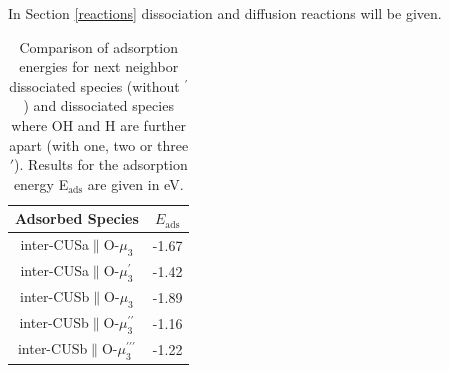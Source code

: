 \documentclass[11pt,DIV=13,BCOR=5mm,a4paper,headinclude]{scrbook}
\begin{document}
In Section \ref{reactions} dissociation and diffusion reactions will be given.
\begin{table}[!ht]
  \centering
 \caption{Comparison of adsorption energies for next neighbor dissociated species (without $^\prime$) and dissociated species where OH and H are further apart (with one, two or three $\prime$). 
Results for the adsorption energy E$_\textrm{ads}$ are given in eV.
\vspace*{.2cm} 
  }
  \begin{tabular}{cc}
  \toprule
  Adsorbed Species  & $E_\text{ads}$  \\\midrule
   inter-CUSa$\parallel$O-$\mu_3$ & -1.67 \\
   inter-CUSa$\parallel$O-$\mu_3^\prime$ & -1.42 \\\hline
   inter-CUSb$\parallel$O-$\mu_3$ & -1.89\\
   inter-CUSb$\parallel$O-$\mu_3^{\prime\prime}$ & -1.16\\
   inter-CUSb$\parallel$O-$\mu_3^{\prime\prime\prime}$ & -1.22\\\bottomrule
  \end{tabular}
  \label{tab:ads_1waterfurther}
\end{table}
\end{document}
